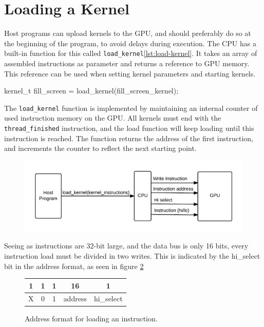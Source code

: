 \section{Loading a Kernel}
Host programs can upload kernels to the GPU, and should preferably do so at the beginning of the program, to avoid delays during execution.
The CPU has a built-in function for this called \verb/load_kernel/\ref{lst:load-kernel}.
It takes an array of assembled instructions as parameter and returns a reference to GPU memory.
This reference can be used when setting kernel parameters and starting kernels.

\begin{c-code}[caption=A load\_kernel function call with the fillscreen kernel, label=lst:load-kernel]
kernel_t fill_screen = load_kernel(fill_screen_kernel);
\end{c-code}

The \verb/load_kernel/ function is implemented by maintaining an internal counter of used instruction memory on the GPU.
All kernels must end with the \verb/thread_finished/ instruction,
and the load function will keep loading until this instruction is reached.
The function returns the address of the first instruction, and increments the counter to reflect the next starting point.

\begin{figure}[H]
    \centering
    \includegraphics[width=\textwidth]{../cpu/diagrams/loading_a_kernel.png}
    \caption{}
    \label{fig:loading_a_kernel}
\end{figure}

Seeing as instructions are 32-bit large, and the data bus is only 16 bits,
every instruction load must be divided in two writes.
This is indicated by the hi\_select bit in the address format, as seen in figure \ref{fig:load_instruction_format}

\begin{figure}[H]
    \centering
    \begin{tabular}{|c|c|c|c|c|}
    \multicolumn{1}{c}{1} & \multicolumn{1}{c}{1} & \multicolumn{1}{c}{1} & \multicolumn{1}{c}{16}  & \multicolumn{1}{c}{1} \\ \hline
    X & 0 & 1 & address & hi\_select \\ \hline
    \end{tabular}
    \caption{Address format for loading an instruction.}
    \label{fig:load_instruction_format}
\end{figure}
